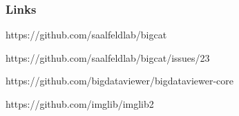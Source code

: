 \documentclass[aspectratio=169,table]{beamer}
\begin{document}

\begin{frame}
    \frametitle{Links}
    \centering
    \scriptsize
    \begin{description}[leftmargin=3.5cm,style=multiline,font=\scriptsize]
          \item[BigCAT] https://github.com/saalfeldlab/bigcat
          \item[Rename BigCAT] https://github.com/saalfeldlab/bigcat/issues/23
          \item[BigDataViewer] https://github.com/bigdataviewer/bigdataviewer-core
          \item[imglib2] https://github.com/imglib/imglib2
    \end{description}
\end{frame}
\end{document}
